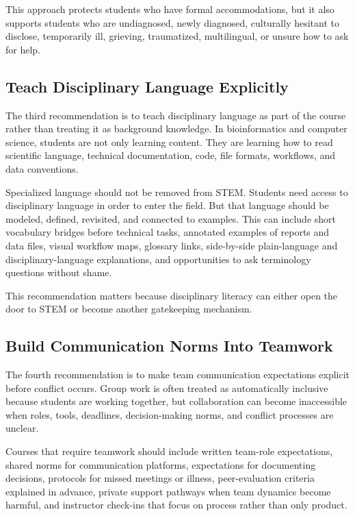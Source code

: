 \documentclass[12pt]{article}
\begin{document}
This approach protects students who have formal accommodations, but it also supports students who are undiagnosed, newly diagnosed, culturally hesitant to disclose, temporarily ill, grieving, traumatized, multilingual, or unsure how to ask for help.

\subsection*{Teach Disciplinary Language Explicitly}

The third recommendation is to teach disciplinary language as part of the course rather than treating it as background knowledge. In bioinformatics and computer science, students are not only learning content. They are learning how to read scientific language, technical documentation, code, file formats, workflows, and data conventions.

Specialized language should not be removed from STEM. Students need access to disciplinary language in order to enter the field. But that language should be modeled, defined, revisited, and connected to examples. This can include short vocabulary bridges before technical tasks, annotated examples of reports and data files, visual workflow maps, glossary links, side-by-side plain-language and disciplinary-language explanations, and opportunities to ask terminology questions without shame.

This recommendation matters because disciplinary literacy can either open the door to STEM or become another gatekeeping mechanism.

\subsection*{Build Communication Norms Into Teamwork}

The fourth recommendation is to make team communication expectations explicit before conflict occurs. Group work is often treated as automatically inclusive because students are working together, but collaboration can become inaccessible when roles, tools, deadlines, decision-making norms, and conflict processes are unclear.

Courses that require teamwork should include written team-role expectations, shared norms for communication platforms, expectations for documenting decisions, protocols for missed meetings or illness, peer-evaluation criteria explained in advance, private support pathways when team dynamics become harmful, and instructor check-ins that focus on process rather than only product.
\end{document}
